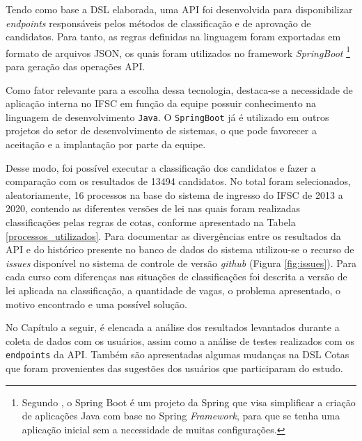 Tendo como base a DSL elaborada, uma \gls{API} foi desenvolvida para disponibilizar \textit{endpoints} responsáveis pelos métodos de classificação e de aprovação de candidatos. Para tanto, as regras definidas na linguagem foram exportadas em formato de arquivos JSON, os quais foram utilizados no framework \textit{SpringBoot} \footnote{Segundo , o Spring Boot é um projeto da Spring que visa simplificar a criação de aplicações Java com base no Spring \textit{Framework}, para que se tenha uma aplicação inicial sem a necessidade de muitas configurações.} para geração das operações \gls{API}. 

Como fator relevante para a escolha dessa tecnologia, destaca-se a necessidade de aplicação interna no \gls{IFSC} em função da equipe possuir conhecimento na linguagem de desenvolvimento \texttt{Java}. O \texttt{SpringBoot} já é utilizado em outros projetos do setor de desenvolvimento de sistemas, o que pode favorecer a aceitação e a implantação por parte da equipe.

Desse modo, foi possível executar a classificação dos candidatos e fazer a comparação com os resultados de 13494 candidatos. No total foram selecionados, aleatoriamente, 16 processos na base do sistema de ingresso do \gls{IFSC} de 2013 a 2020, contendo as diferentes versões de lei nas quais foram realizadas classificações pelas regras de cotas, conforme apresentado na Tabela \ref{processos_utilizados}. Para documentar as divergências entre os resultados da \gls{API} e do histórico presente no banco de dados do sistema utilizou-se o recurso de \textit{issues} disponível no sistema de controle de versão \textit{github} (Figura \ref{fig:issues}). Para cada curso com diferenças nas situações de classificações foi descrita a versão de lei aplicada na classificação, a quantidade de vagas, o problema apresentado, o motivo encontrado e uma possível solução.





\newpage
No Capítulo a seguir, é elencada a análise dos resultados levantados durante a coleta de dados com os usuários, assim como a análise de testes realizados com os \texttt{endpoints} da API. Também são apresentadas algumas mudanças na DSL Cotas que foram provenientes das sugestões dos usuários que participaram do estudo.

